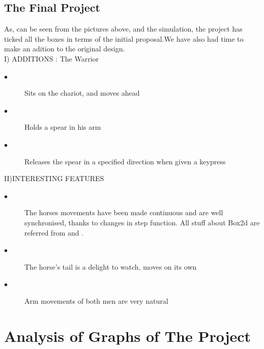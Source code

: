 \documentclass[11pt]{article}
\begin{document}
	\subsection*{The Final Project}
		As, can be seen from the pictures above, and the simulation, the project has ticked all the boxes in terms of the initial 			proposal.We have also had time to make an adition to the original design.
		\\I) ADDITIONS : The Warrior
	\begin{description}
		\item[$\bullet$ ] Sits on the chariot, and moves ahead
		\item[$\bullet$ ] Holds a spear in his arm
		\item[$\bullet$ ] Releases the spear in a specified direction when given a keypress
	\end{description}
	
	II)INTERESTING FEATURES
	\begin{description}
		\item[$\bullet$ ] The horses movements have been made continuous and are well synchronised, thanks to changes in step function.
		All stuff about Box2d are referred from \cite{box2d} and \cite{box}.
		\item[$\bullet$ ] The horse's tail is a delight to watch, moves on its own
		\item[$\bullet$ ] Arm movements of both men are very natural
	\end{description}
	\section*{Analysis of Graphs of The Project}
\end{document}
